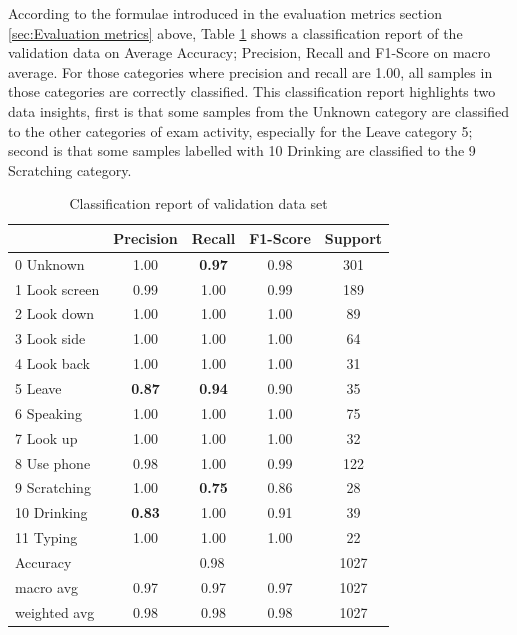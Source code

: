 According to the formulae introduced in the evaluation metrics section \ref{sec:Evaluation metrics} above, Table \ref{tab:Classification report} shows a classification report of the validation data on Average Accuracy; Precision, Recall and F1-Score on macro average.
For those categories where precision and recall are 1.00, all samples in those categories are correctly classified.
This classification report highlights two data insights, first is that some samples from the Unknown category are classified to the other categories of exam activity, especially for the Leave category 5; second is that some samples labelled with 10 Drinking are classified to the 9 Scratching category.

\begin{table}[!htbp]
\centering
\begin{tabular}{|l|c|c|c|c|}
\hline
              & Precision & Recall & F1-Score & Support \\ \hline
0 Unknown     & 1.00      & \textbf{0.97}   & 0.98     & 301     \\ \hline
1 Look screen & 0.99      & 1.00   & 0.99     & 189     \\ \hline
2 Look down   & 1.00      & 1.00   & 1.00     & 89      \\ \hline
3 Look side   & 1.00      & 1.00   & 1.00     & 64      \\ \hline
4 Look back   & 1.00      & 1.00   & 1.00     & 31      \\ \hline
5 Leave       & \textbf{0.87}      & \textbf{0.94}   & 0.90     & 35      \\ \hline
6 Speaking    & 1.00      & 1.00   & 1.00     & 75      \\ \hline
7 Look up     & 1.00      & 1.00   & 1.00     & 32      \\ \hline
8 Use phone   & 0.98      & 1.00   & 0.99     & 122     \\ \hline
9 Scratching  & 1.00      & \textbf{0.75}   & 0.86     & 28      \\ \hline
10 Drinking   & \textbf{0.83}      & 1.00   & 0.91     & 39      \\ \hline
11 Typing     & 1.00      & 1.00   & 1.00     & 22      \\ \hline
Accuracy      & \multicolumn{3}{c|}{0.98}     & 1027    \\ \hline
macro avg     & 0.97      & 0.97   & 0.97     & 1027    \\ \hline
weighted avg  & 0.98      & 0.98   & 0.98     & 1027    \\ \hline
\end{tabular}
\caption{Classification report of validation data set}
\label{tab:Classification report}
\end{table}

